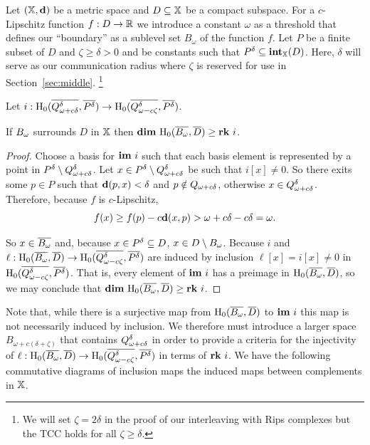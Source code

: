 Let $(\mathbb{X},\mathbf{d})$ be a metric space and $D\subseteq \mathbb{X}$ be a compact subspace.
For a $c$-Lipschitz function $f : D\to \mathbb{R}$ we introduce a constant $\omega$ as a threshold that defines our ``boundary'' as a sublevel set $B_\omega$ of the function $f$.
Let $P$ be a finite subset of $D$ and $\zeta\geq\delta > 0 $ and be constants such that $P^\delta\subseteq \mathbf{int}_{\mathbb{X}}(D)$.
Here, $\delta$ will serve as our communication radius where $\zeta$ is reserved for use in Section~\ref{sec:middle}.
  \footnote{We will set $\zeta = 2\delta$ in the proof of our interleaving with Rips complexes but the TCC holds for all $\zeta\geq\delta$.}

\begin{lemma}\label{lem:psurj}
  Let $i : \mathrm{H}_0(\overline{Q_{\omega + c{\delta}}^{\delta}}, \overline{P^{\delta}})\to \mathrm{H}_0(\overline{Q_{\omega - c\zeta}^{\delta}}, \overline{P^\delta})$.

  If $B_{\omega}$ surrounds $D$ in $\mathbb{X}$ then $\mathbf{dim}~\mathrm{H}_0(\overline{B_{\omega}}, \overline{D})\geq \mathbf{rk}~i$.
\end{lemma}
\begin{proof}
  Choose a basis for $\mathbf{im}~i$ such that each basis element is represented by a point in $P^{\delta}\setminus Q_{\omega + c{\delta}}^{\delta}$.
  Let $x\in P^{\delta}\setminus Q_{\omega + c{\delta}}^{\delta}$ be such that $i[x] \neq 0$.
  So there exits some $p\in P$ such that $\mathbf{d}(p, x) < \delta$ and $p\notin Q_{\omega + c{\delta}}$, otherwise $x\in Q_{\omega + c{\delta}}^{\delta}$.
  Therefore, because $f$ is $c$-Lipschitz,
  \[ f(x)\geq f(p) - c\mathbf{d}(x, p) > \omega + c{\delta} - c{\delta} =\omega.\]

  So $x\in\overline{B_{\omega}}$ and, because $x\in P^{\delta}\subseteq D$, $x\in D\setminus B_{\omega}$.
  Because $i$ and $\ell : \mathrm{H}_0(\overline{B_{\omega}}, \overline{D})\to \mathrm{H}_0(\overline{Q_{\omega - c\zeta}^{\delta}}, \overline{P^{\delta}})$ are induced by inclusion $\ell[x] = i[x]\neq 0$ in $\mathrm{H}_0(\overline{Q_{\omega - c\zeta}^{\delta}}, \overline{P^{\delta}})$.
  That is, every element of $\mathbf{im}~i$ has a preimage in $\mathrm{H}_0(\overline{B_{\omega}}, \overline{D})$, so we may conclude that $\mathbf{dim}~\mathrm{H}_0(\overline{B_{\omega}}, \overline{D})\geq \mathbf{rk}~i$.
\end{proof}

Note that, while there is a surjective map from $\mathrm{H}_0(\overline{B_{\omega}}, \overline{D})$ to $\mathbf{im}~i$ this map is not necessarily induced by inclusion.
We therefore must introduce a larger space $B_{\omega+c(\delta+\zeta)}$ that contains $Q_{\omega + c{\delta}}^{\delta}$ in order to provide a criteria for the injectivity of $\ell : \mathrm{H}_0(\overline{B_{\omega}}, \overline{D})\to\mathrm{H}_0(\overline{Q_{\omega - c\zeta}^{\delta}}, \overline{P^{\delta}})$ in terms of $\mathbf{rk}~i$.
We have the following commutative diagrams of inclusion maps the induced maps between complements in $\mathbb{X}$.


